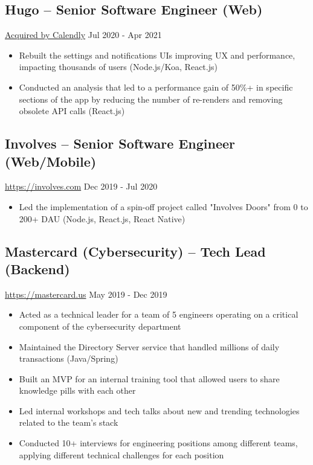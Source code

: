 \documentclass[11pt, a4paper]{article}
\begin{document}
\subsection*{Hugo -- Senior Software Engineer (Web)}
\href{https://www.linkedin.com/company/hugo-team/}{Acquired by Calendly} \hfill Jul 2020 - Apr 2021
\begin{itemize}[noitemsep]
    \item Rebuilt the settings and notifications UIs improving UX and performance, impacting thousands of users (Node.js/Koa, React.js)
    \item Conducted an analysis that led to a performance gain of 50\%+ in specific sections of the app by reducing the number of re-renders and removing obsolete API calls (React.js)
\end{itemize}

\subsection*{Involves -- Senior Software Engineer (Web/Mobile)}
\href{https://involves.com/}{https://involves.com} \hfill Dec 2019 - Jul 2020
\begin{itemize}[noitemsep]
    \item Led the implementation of a spin-off project called "Involves Doors" from 0 to 200+ DAU (Node.js, React.js, React Native)
\end{itemize}

\subsection*{Mastercard (Cybersecurity) -- Tech Lead (Backend)}
\href{https://www.mastercard.us/en-us.html}{https://mastercard.us} \hfill May 2019 - Dec 2019
\begin{itemize}[noitemsep]
    \item Acted as a technical leader for a team of 5 engineers operating on a critical component of the cybersecurity department
    \item Maintained the Directory Server service that handled millions of daily transactions (Java/Spring)
    \item Built an MVP for an internal training tool that allowed users to share knowledge pills with each other
    \item Led internal workshops and tech talks about new and trending technologies related to the team's stack
    \item Conducted 10+ interviews for engineering positions among different teams, applying different technical challenges for each position
\end{itemize}
\end{document}
